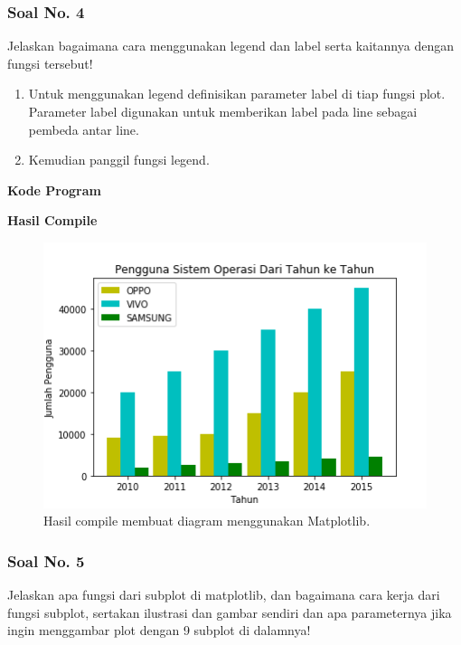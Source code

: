 \subsubsection{Soal No. 4}
\hfill \break
Jelaskan bagaimana cara menggunakan legend dan label serta kaitannya dengan fungsi tersebut!

\begin{enumerate}
	\item Untuk menggunakan legend definisikan parameter label di tiap fungsi plot. Parameter label digunakan untuk memberikan label pada line sebagai pembeda antar line.
	
	
	
	\item Kemudian panggil fungsi legend.
	
	
\end{enumerate}

\hfill \break
\textbf{Kode Program}



\hfill \break
\textbf{Hasil Compile}

\begin{figure}[H]
	\includegraphics[width=12cm]{figures/6/1174026/4.png}
	\centering
	\caption{Hasil compile membuat diagram menggunakan Matplotlib.}
\end{figure}

\subsubsection{Soal No. 5}
\hfill \break
Jelaskan apa fungsi dari subplot di matplotlib, dan bagaimana cara kerja dari fungsi subplot, sertakan ilustrasi dan gambar sendiri dan apa parameternya jika ingin menggambar plot dengan 9 subplot di dalamnya!


